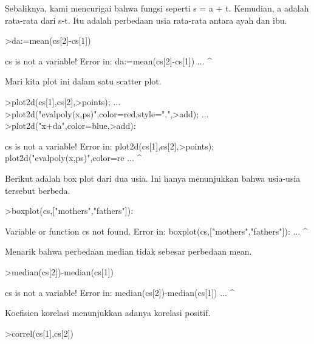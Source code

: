 \documentclass[a4paper,10pt]{article}
\begin{document}
\begin{eulernotebook}
\begin{eulercomment}
Sebaliknya, kami mencurigai bahwa fungsi seperti s = a + t. Kemudian,
a adalah rata-rata dari s-t. Itu adalah perbedaan usia rata-rata
antara ayah dan ibu.
\end{eulercomment}
\begin{eulerprompt}
>da:=mean(cs[2]-cs[1])
\end{eulerprompt}
\begin{euleroutput}
  cs is not a variable!
  Error in:
  da:=mean(cs[2]-cs[1]) ...
                ^
\end{euleroutput}
\begin{eulercomment}
Mari kita plot ini dalam satu scatter plot.
\end{eulercomment}
\begin{eulerprompt}
>plot2d(cs[1],cs[2],>points);  ...
>plot2d("evalpoly(x,ps)",color=red,style=".",>add);  ...
>plot2d("x+da",color=blue,>add):
\end{eulerprompt}
\begin{euleroutput}
  cs is not a variable!
  Error in:
  plot2d(cs[1],cs[2],>points);  plot2d("evalpoly(x,ps)",color=re ...
              ^
\end{euleroutput}
\begin{eulercomment}
Berikut adalah box plot dari dua usia. Ini hanya menunjukkan bahwa
usia-usia tersebut berbeda.
\end{eulercomment}
\begin{eulerprompt}
>boxplot(cs,["mothers","fathers"]):
\end{eulerprompt}
\begin{euleroutput}
  Variable or function cs not found.
  Error in:
  boxplot(cs,["mothers","fathers"]): ...
            ^
\end{euleroutput}
\begin{eulercomment}
Menarik bahwa perbedaan median tidak sebesar perbedaan mean.
\end{eulercomment}
\begin{eulerprompt}
>median(cs[2])-median(cs[1])
\end{eulerprompt}
\begin{euleroutput}
  cs is not a variable!
  Error in:
  median(cs[2])-median(cs[1]) ...
              ^
\end{euleroutput}
\begin{eulercomment}
Koefisien korelasi menunjukkan adanya korelasi positif.
\end{eulercomment}
\begin{eulerprompt}
>correl(cs[1],cs[2])
\end{eulerprompt}

\end{eulernotebook}
\end{document}
